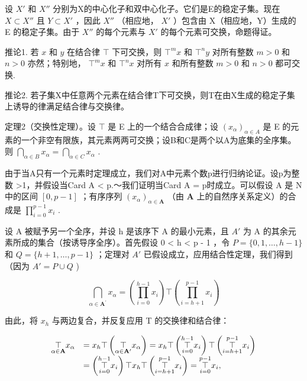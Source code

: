 设 \(X'\) 和 \(X''\) 分别为X的中心化子和双中心化子。它们是E的稳定子集。现在 \(X \subset X''\) 且 \(Y \subset X'\) ，因此 \(X''\) （相应地， \(X'\) ）包含由 X（相应地，Y）生成的 E 的稳定子集。由于 \(X''\) 的每个元素与 \(X'\) 的每个元素可交换，命题得证。

推论1. 若 \(x\) 和 \(y\) 在结合律 \(\top\) 下可交换，则 \(\top^m x\) 和 \(\top^n y\) 对所有整数 \(m > 0\) 和 \(n > 0\) 亦然；特别地， \(\top^m x\) 和 \(\top^n x\) 对所有 \(x\) 和所有整数 \(m > 0\) 和 \(n > 0\) 都可交换.

推论2. 若子集X中任意两个元素在结合律T下可交换，则T在由X生成的稳定子集上诱导的律满足结合律与交换律。

定理2（交换性定理）。设 \(\top\) 是 E 上的一个结合合成律；设 \((x_{\alpha})_{\alpha \in A}\) 是 E 的元素的一个非空有限族，其元素两两可交换；设B和C是两个以A为底集的全序集。则 \(\bigcap_{\alpha \in B} x_{\alpha} = \bigcap_{\alpha \in C} x_{\alpha}\) .

由于当A只有一个元素时定理成立，我们对A中元素个数p进行归纳论证。设p为整数 \textgreater1，并假设当Card A \textless{} p.～我们证明当Card A = p时成立。可以假设 A 是 N 中的区间 \([0, p - 1]\) ；有序序列 \((x_{\alpha})_{\alpha \in \mathbf{A}}\) （由 \(\mathbf{A}\) 上的自然序关系定义）的合成是 \(\prod_{i = 0}^{p - 1}x_i\) .

设 A 被赋予另一个全序，并设 h 是该序下 A 的最小元素，且 \(A'\) 为 A 的其余元素所成的集合（按诱导序全序）。首先假设 0 \textless{} h \textless{} p - 1 ，令 \(P = \{0, 1, \ldots, h - 1\}\) 和 \(Q = \{h + 1, \ldots, p - 1\}\) ；定理对 \(A'\) 已假设成立，应用结合性定理，我们得到（因为 \(A' = P \cup Q\) )

\[
\bigcap_ {\alpha \in \mathbf {A} ^ {\prime}} x _ {\alpha} = \left(\prod_ {i = 0} ^ {h - 1} x _ {i}\right) \top \left(\prod_ {i = h + 1} ^ {p - 1} x _ {i}\right)
\]

由此，将 \(x_{h}\) 与两边复合，并反复应用 T 的交换律和结合律：

\[
\begin{array}{r l} \underset {\alpha \in \mathbf {A}} {\top} x _ {\alpha} & = x _ {h} \top \left(\underset {\alpha \in \mathbf {A} ^ {\prime}} {\top} x _ {\alpha}\right) = x _ {h} \top \left(\underset {i = 0} {\overset {h - 1} {\top}} x _ {i}\right) \top \left(\underset {i = h + 1} {\overset {p - 1} {\top}} x _ {i}\right) \\ & = \left(\underset {i = 0} {\overset {h - 1} {\top}} x _ {i}\right) \top x _ {h} \top \left(\underset {i = h + 1} {\overset {p - 1} {\top}} x _ {i}\right) = \underset {i = 0} {\overset {p - 1} {\top}} x _ {i}, \end{array}
\]

